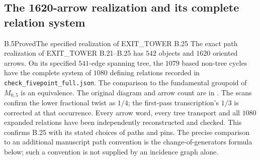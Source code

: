 \subsection{The 1620-arrow realization and its complete relation system}
\label{sec:1620-audit}

\begin{result}{B.5}{Proved}{The specified realization of EXIT\_TOWER B.25}
The exact path realization of EXIT\_TOWER B.21--B.25 has $542$ objects
and $1620$ oriented arrows.  On its specified $541$-edge spanning tree,
the $1079$ based non-tree cycles have the complete system of $1080$
defining relations recorded in \texttt{check\_fivepoint\_full.json}.
The comparison to the fundamental groupoid of $M_{0,5}$ is an equivalence.
The original diagram and arrow count are in
\cite[manuscript folios~30 and~32, PDF scans~31 and~33]{GrothendieckCote148}.
The scans confirm the lower fractional twist as $1/4$; the
first-pass transcription's $1/3$ is corrected at that occurrence.
Every arrow word, every tree transport and all $1080$ expanded relations
have been independently reconstructed and checked.  This confirms B.25
with its stated choices of paths and pins.  The precise comparison to
an additional manuscript path convention is the change-of-generators
formula below; such a convention is not supplied by an incidence graph
alone.
\end{result}

